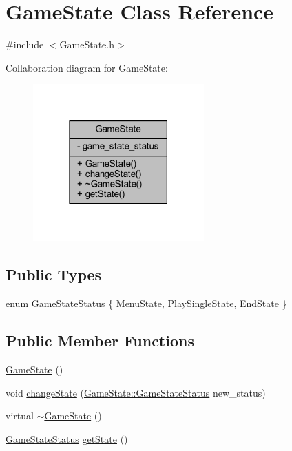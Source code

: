 \hypertarget{class_game_state}{}\section{Game\+State Class Reference}
\label{class_game_state}


{\ttfamily \#include $<$Game\+State.\+h$>$}



Collaboration diagram for Game\+State\+:\nopagebreak
\begin{figure}[H]
\begin{center}
\leavevmode
\includegraphics[width=186pt]{class_game_state__coll__graph}
\end{center}
\end{figure}
\subsection*{Public Types}
\begin{DoxyCompactItemize}
\item 
enum \hyperlink{class_game_state_a921b00cc8c4eb15a3ae9f5061f44bd85}{Game\+State\+Status} \{ \hyperlink{class_game_state_a921b00cc8c4eb15a3ae9f5061f44bd85a51f924895923aaa37adfe55a15929e84}{Menu\+State}, 
\hyperlink{class_game_state_a921b00cc8c4eb15a3ae9f5061f44bd85ac2cc6ee014ef8d373d158e5be10a2c08}{Play\+Single\+State}, 
\hyperlink{class_game_state_a921b00cc8c4eb15a3ae9f5061f44bd85a3470235edc7f9177b35063100d4117ee}{End\+State}
 \}
\end{DoxyCompactItemize}
\subsection*{Public Member Functions}
\begin{DoxyCompactItemize}
\item 
\hyperlink{class_game_state_a4fa0a2bf50315c4a35a3890a0adcee5c}{Game\+State} ()
\item 
void \hyperlink{class_game_state_a9f10dd6cb64501f748c31a9f7ecc3466}{change\+State} (\hyperlink{class_game_state_a921b00cc8c4eb15a3ae9f5061f44bd85}{Game\+State\+::\+Game\+State\+Status} new\+\_\+status)
\item 
virtual \hyperlink{class_game_state_ae623df5042cd0c17daa3394fdcb397b3}{$\sim$\+Game\+State} ()
\item 
\hyperlink{class_game_state_a921b00cc8c4eb15a3ae9f5061f44bd85}{Game\+State\+Status} \hyperlink{class_game_state_a9b808c211f0155b3d2994ec1e2c32f33}{get\+State} ()
\end{DoxyCompactItemize}
